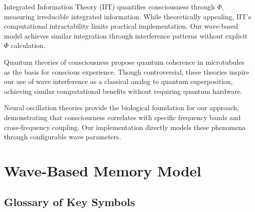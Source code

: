 \documentclass[11pt,letterpaper]{article}
\begin{document}
Integrated Information Theory (IIT) \cite{tononi2016integrated} quantifies consciousness through $\Phi$, measuring irreducible integrated information. While theoretically appealing, IIT's computational intractability limits practical implementation. Our wave-based model achieves similar integration through interference patterns without explicit $\Phi$ calculation.

Quantum theories of consciousness \cite{penrose1994shadows, tegmark2000importance} propose quantum coherence in microtubules as the basis for conscious experience. Though controversial, these theories inspire our use of wave interference as a classical analog to quantum superposition, achieving similar computational benefits without requiring quantum hardware.

Neural oscillation theories \cite{buzsaki2006rhythms, fries2015rhythms} provide the biological foundation for our approach, demonstrating that consciousness correlates with specific frequency bands and cross-frequency coupling. Our implementation directly models these phenomena through configurable wave parameters.

\section{Wave-Based Memory Model}

\subsection{Glossary of Key Symbols}
\end{document}
